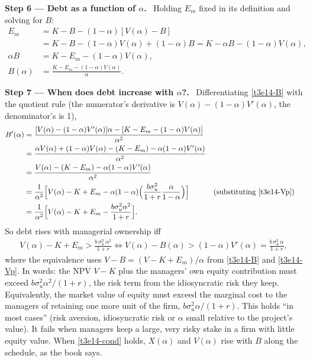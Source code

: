 \documentclass[11pt,a4paper]{article}
\newcommand{\step}[2]{\par\medskip\noindent\textbf{Step #1 --- #2.}~}
\begin{document}
\step{6}{Debt as a function of $\alpha$} Holding $E_m$ fixed in its definition and solving for $B$:
\begin{align}
  E_m &= K-B-(1-\alpha)[V(\alpha)-B] \nonumber\\
      &= K-B-(1-\alpha)V(\alpha)+(1-\alpha)B = K-\alpha B-(1-\alpha)V(\alpha), \nonumber\\
  \alpha B &= K-E_m-(1-\alpha)V(\alpha), \nonumber\\
  B(\alpha) &= \frac{K-E_m-(1-\alpha)V(\alpha)}{\alpha}. \label{t3e14-B}
\end{align}

\step{7}{When does debt increase with $\alpha$?} Differentiating \eqref{t3e14-B} with the quotient rule (the numerator's derivative is $V(\alpha)-(1-\alpha)V'(\alpha)$, the denominator's is 1),
\begin{align}
  B'(\alpha) &= \frac{[V(\alpha)-(1-\alpha)V'(\alpha)]\alpha-[K-E_m-(1-\alpha)V(\alpha)]}{\alpha^2} \nonumber\\
  &= \frac{\alpha V(\alpha)+(1-\alpha)V(\alpha)-(K-E_m)-\alpha(1-\alpha)V'(\alpha)}{\alpha^2} \nonumber\\
  &= \frac{V(\alpha)-(K-E_m)-\alpha(1-\alpha)V'(\alpha)}{\alpha^2} \nonumber\\
  &= \frac{1}{\alpha^2}\Bigl[V(\alpha)-K+E_m-\alpha(1-\alpha)\Bigl(\frac{b\sigma_u^2}{1+r}\frac{\alpha}{1-\alpha}\Bigr)\Bigr] && \text{(substituting \eqref{t3e14-Vp})} \nonumber\\
  &= \frac{1}{\alpha^2}\Bigl[V(\alpha)-K+E_m-\frac{b\sigma_u^2\alpha^2}{1+r}\Bigr]. \label{t3e14-Bp}
\end{align}
So debt rises with managerial ownership iff
\begin{align}
  V(\alpha)-K+E_m > \frac{b\,\sigma_u^2\,\alpha^2}{1+r}
  \iff V(\alpha)-B(\alpha) > (1-\alpha)V'(\alpha) = \frac{b\,\sigma_u^2\,\alpha}{1+r}, \label{t3e14-cond}
\end{align}
where the equivalence uses $V-B=(V-K+E_m)/\alpha$ from \eqref{t3e14-B} and \eqref{t3e14-Vp}. In words: the
NPV $V-K$ plus the managers' own equity contribution must exceed $b\sigma_u^2\alpha^2/(1+r)$, the risk
term from the idiosyncratic risk they keep. Equivalently, the market value of equity must exceed the
marginal cost to the managers of retaining one more unit of the firm, $b\sigma_u^2\alpha/(1+r)$. This holds
``in most cases'' (risk aversion, idiosyncratic risk or $\alpha$ small relative to the project's value). It
fails when managers keep a large, very risky stake in a firm with little equity value. When
\eqref{t3e14-cond} holds, $X(\alpha)$ and $V(\alpha)$ rise with $B$ along the schedule, as the book says.
\end{document}
